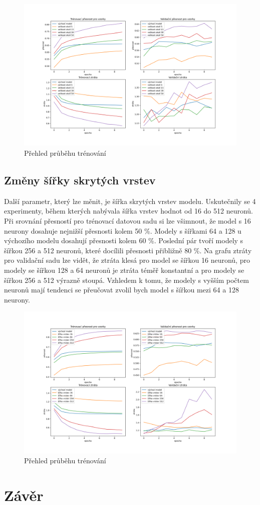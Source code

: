 \documentclass[FM,BP]{tulthesis}
\begin{document}
\begin{figure}[!htbp]
\centerline{\includegraphics[scale=.5]{prubeh_trenovani_sekce_okoli.png}}
\caption{Přehled průběhu trénování}
\label{fig}
\end{figure}
\FloatBarrier

\section{Změny šířky skrytých vrstev}
Další parametr, který lze měnit, je šířka skrytých vrstev modelu. Uskutečnily se 4 experimenty, během kterých nabývala šířka vrstev hodnot od 16 do 512 neuronů. Při srovnání přesností pro trénovací datovou sadu si lze všimnout, že model s 16 neurony dosahuje nejnižší přesnosti kolem 50 \%. Modely s šířkami 64 a 128 u výchozího modelu dosahují přesnosti kolem 60 \%. Poslední pár tvoří modely s šířkou 256 a 512 neuronů, které docílili přesnosti přibližně 80 \%. Na grafu ztráty pro validační sadu lze vidět, že ztráta klesá pro model se šířkou 16 neuronů, pro modely se šířkou 128 a 64 neuronů je ztráta téměř konstantní a pro modely se šířkou 256 a 512 výrazně stoupá. Vzhledem k tomu, že modely s vyšším počtem neuronů mají tendenci se přeučovat zvolil bych model s šířkou mezi 64 a 128 neurony.

\begin{figure}[!htbp]
\centerline{\includegraphics[scale=.5]{prubeh_trenovani_sekce_sirka.png}}
\caption{Přehled průběhu trénování}
\label{fig}
\end{figure}
\FloatBarrier

\chapter{Závěr}

\nocite{*}
\printbibliography[title={Použitá literatura}] %
\end{document}
